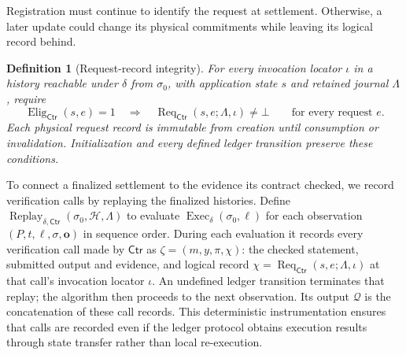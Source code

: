 \documentclass[10pt,letterpaper]{article}
\newtheorem{definition}{Definition}
\newcommand{\Ctr}{\mathsf{Ctr}}
\begin{document}
Registration must continue to identify the request at settlement. Otherwise, a later update could change its physical commitments while leaving its logical record behind.

\begin{definition}[Request-record integrity]
\label{def:request-integrity}
For every invocation locator $\iota$ in a history reachable under $\delta$ from $\sigma_0$, with application state $s$ and retained journal $\Lambda$, require
\[
 \operatorname{Elig}_{\Ctr}(s,e)=1
 \quad\Longrightarrow\quad
 \operatorname{Req}_{\Ctr}(s,e;\Lambda,\iota)\ne\bot
 \qquad\text{for every request }e.
\]
Each physical request record is immutable from creation until consumption or invalidation. Initialization and every defined ledger transition preserve these conditions.
\end{definition}

To connect a finalized settlement to the evidence its contract checked, we record verification calls by replaying the finalized histories. Define $\operatorname{Replay}_{\delta,\Ctr}(\sigma_0,\mathcal H,\Lambda)$ to evaluate $\operatorname{Exec}_\delta(\sigma_0,\ell)$ for each observation $(P,t,\ell,\sigma,\mathbf o)$ in sequence order. During each evaluation it records every verification call made by $\Ctr$ as $\zeta=(m,y,\pi,\chi)$: the checked statement, submitted output and evidence, and logical record $\chi=\operatorname{Req}_{\Ctr}(s,e;\Lambda,\iota)$ at that call's invocation locator $\iota$. An undefined ledger transition terminates that replay; the algorithm then proceeds to the next observation. Its output $\mathcal Q$ is the concatenation of these call records. This deterministic instrumentation ensures that calls are recorded even if the ledger protocol obtains execution results through state transfer rather than local re-execution.
\end{document}
